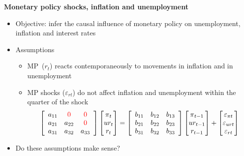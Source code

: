\documentclass[10pt,handout]{beamer}
\begin{document}
\begin{frame}
{\textbf{Monetary policy shocks, inflation and unemployment}}

\begin{itemize}
\item Objective: infer the causal influence of monetary policy on
unemployment, inflation and interest rates\pause

\item Assumptions

\begin{itemize}
\item MP\ ($r_{t}$) reacts contemporaneously to movements in inflation and
in unemployment

\item MP shocks ($\varepsilon _{rt}$) do not affect inflation and
unemployment within the quarter of the shock\smallskip \pause%
\begin{equation*}
\left[ 
\begin{array}{ccc}
a_{11} & {\color{red}{0}} & {\color{red}{0}} \\ 
a_{21} & a_{22} & {\color{red}{0}} \\ 
a_{31} & a_{32} & a_{33}%
\end{array}%
\right] 
\begin{bmatrix}
\pi _{t} \\ 
ur_{t} \\ 
r_{t}%
\end{bmatrix}%
=\left[ 
\begin{array}{ccc}
b_{11} & b_{12} & b_{13} \\ 
b_{21} & b_{22} & b_{23} \\ 
b_{31} & b_{32} & b_{33}%
\end{array}%
\right] 
\begin{bmatrix}
\pi _{t-1} \\ 
ur_{t-1} \\ 
r_{t-1}%
\end{bmatrix}%
+%
\begin{bmatrix}
\varepsilon _{\pi t} \\ 
\varepsilon _{urt} \\ 
\varepsilon _{rt}%
\end{bmatrix}%
\end{equation*}
\end{itemize}

\item Do these assumptions make sense?
\end{itemize}
\end{frame}
\end{document}
